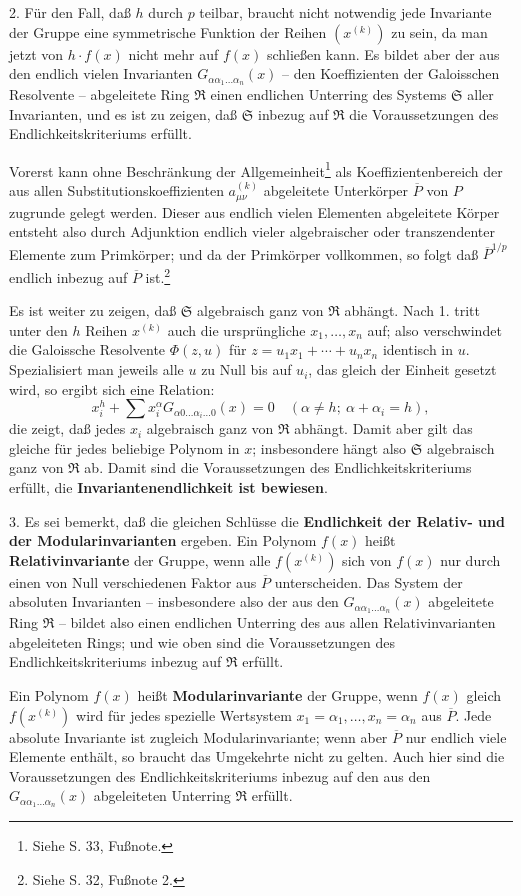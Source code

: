 2. Für den Fall, daß $h$ durch $p$ teilbar, braucht nicht notwendig jede Invariante der Gruppe eine symmetrische Funktion der Reihen $(x^{(k)})$ zu sein, da man jetzt von $h\cdot f(x)$ nicht mehr auf $f(x)$ schließen kann. Es bildet aber der aus den endlich vielen Invarianten $G_{\alpha\alpha_1\ldots\alpha_n}(x)$ -- den Koeffizienten der Galoisschen Resolvente -- abgeleitete Ring $\mathfrak R$ einen endlichen Unterring des Systems $\mathfrak S$ aller Invarianten, und es ist zu zeigen, daß $\mathfrak S$ inbezug auf $\mathfrak R$ die Voraussetzungen des Endlichkeitskriteriums erfüllt.

Vorerst kann ohne Beschränkung der Allgemeinheit\footnote{Siehe S. 33, Fußnote.} als Koeffizientenbereich der aus allen Substitutionskoeffizienten $a_{\mu\nu}^{(k)}$ abgeleitete Unterkörper $\overline P$ von $P$ zugrunde gelegt werden. Dieser aus endlich vielen Elementen abgeleitete Körper entsteht also durch Adjunktion endlich vieler algebraischer oder transzendenter Elemente zum Primkörper; und da der Primkörper vollkommen, so folgt daß $\overline P^{1/p}$ endlich inbezug auf $\overline P$ ist.\footnote{Siehe S. 32, Fußnote 2.}

Es ist weiter zu zeigen, daß $\mathfrak S$ algebraisch ganz von $\mathfrak R$ abhängt. Nach 1. tritt unter den $h$ Reihen $x^{(k)}$ auch die ursprüngliche $x_1,\ldots,x_n$ auf; also verschwindet die Galoissche Resolvente $\Phi(z,u)$ für $z=u_1x_1+\cdots+u_nx_n$ identisch in $u$. Spezialisiert man jeweils alle $u$ zu Null bis auf $u_i$, das gleich der Einheit gesetzt wird, so ergibt sich eine Relation:
\[
 x_i^h+\sum x_i^\alpha G_{\alpha0\ldots\alpha_i\ldots0}(x)=0
 \quad (\alpha\ne h;\ \alpha+\alpha_i=h),
\]
die zeigt, daß jedes $x_i$ algebraisch ganz von $\mathfrak R$ abhängt. Damit aber gilt das gleiche für jedes beliebige Polynom in $x$; insbesondere hängt also $\mathfrak S$ algebraisch ganz von $\mathfrak R$ ab. Damit sind die Voraussetzungen des Endlichkeitskriteriums erfüllt, die \textbf{Invariantenendlichkeit ist bewiesen}.

3. Es sei bemerkt, daß die gleichen Schlüsse die \textbf{Endlichkeit der Relativ- und der Modularinvarianten} ergeben. Ein Polynom $f(x)$ heißt \textbf{Relativinvariante} der Gruppe, wenn alle $f(x^{(k)})$ sich von $f(x)$ nur durch einen von Null verschiedenen Faktor aus $\overline P$ unterscheiden. Das System der absoluten Invarianten -- insbesondere also der aus den $G_{\alpha\alpha_1\ldots\alpha_n}(x)$ abgeleitete Ring $\mathfrak R$ -- bildet also einen endlichen Unterring des aus allen Relativinvarianten abgeleiteten Rings; und wie oben sind die Voraussetzungen des Endlichkeitskriteriums inbezug auf $\mathfrak R$ erfüllt.

Ein Polynom $f(x)$ heißt \textbf{Modularinvariante} der Gruppe, wenn $f(x)$ gleich $f(x^{(k)})$ wird für jedes spezielle Wertsystem $x_1=\alpha_1,\ldots,x_n=\alpha_n$ aus $\overline P$. Jede absolute Invariante ist zugleich Modularinvariante; wenn aber $\overline P$ nur endlich viele Elemente enthält, so braucht das Umgekehrte nicht zu gelten. Auch hier sind die Voraussetzungen des Endlichkeitskriteriums inbezug auf den aus den $G_{\alpha\alpha_1\ldots\alpha_n}(x)$ abgeleiteten Unterring $\mathfrak R$ erfüllt.


\clearpage
